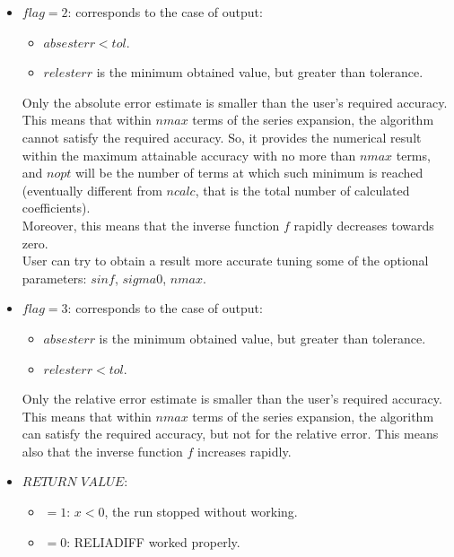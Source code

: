 \documentclass[10pt]{article}
\begin{document}
\begin{description}
\begin{itemize}
 \item[] $flag =2$: corresponds to the case of output:
\begin{itemize}
\item $absesterr < tol$.
\item $relesterr$ is the minimum obtained value, but greater than tolerance.
\end{itemize}
            Only the absolute error estimate is smaller than the user's required accuracy. \\
This means that within $nmax$ terms of the series expansion, the algorithm cannot satisfy the required accuracy. So, it provides the numerical result within the maximum attainable accuracy with no more than $nmax$ terms, and $nopt$ will be the  number of terms  at which such minimum is reached (eventually different from $ncalc$, that is the total number of calculated coefficients). \\
Moreover, this means that the inverse function $f$ rapidly decreases towards zero.\\
User can try to obtain a  result more accurate tuning some of the optional parameters: $sinf$, $sigma0$, $nmax$.

\item[] $flag =3$: corresponds to the case of output:
\begin{itemize}
\item $absesterr$ is the minimum obtained value, but greater than tolerance.
\item $relesterr < tol$.
\end{itemize}
 Only the relative error estimate is smaller than the user's required accuracy.\\
This means that within $nmax$ terms of the series expansion, the algorithm can   satisfy the required accuracy, but not for the relative error. This means also that the inverse function $f$ increases rapidly.

\item  $RETURN\,\, VALUE$:

\begin{itemize}
\item[] $=1$: $x<0$, the run stopped without working.
\item[] $=0$: RELIADIFF worked properly.
\end{itemize}


\end{itemize}
\end{description}
\end{document}
